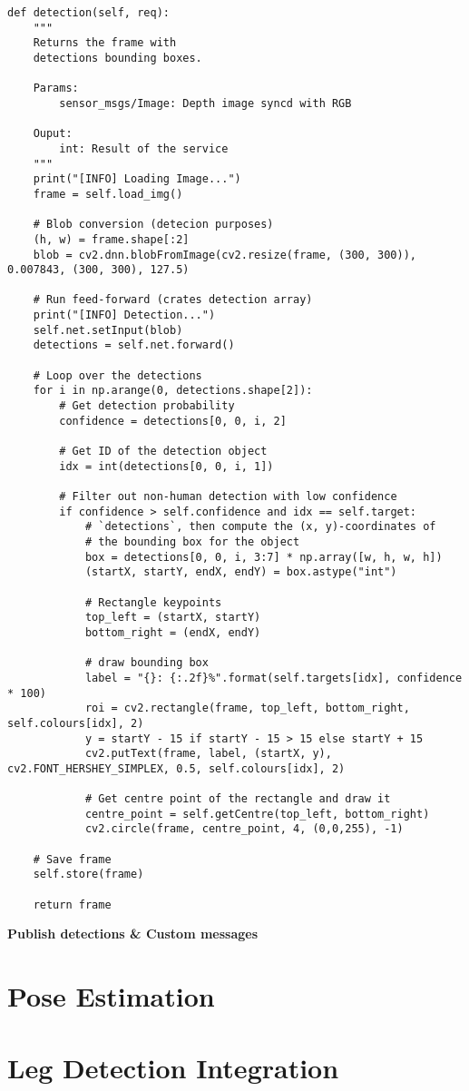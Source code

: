 \begin{lstlisting}
def detection(self, req):
	"""
    Returns the frame with
    detections bounding boxes.

    Params:
    	sensor_msgs/Image: Depth image syncd with RGB

    Ouput:
    	int: Result of the service
	"""
    print("[INFO] Loading Image...")
    frame = self.load_img()

    # Blob conversion (detecion purposes)
    (h, w) = frame.shape[:2]
    blob = cv2.dnn.blobFromImage(cv2.resize(frame, (300, 300)), 0.007843, (300, 300), 127.5)

    # Run feed-forward (crates detection array)
    print("[INFO] Detection...")
    self.net.setInput(blob)
    detections = self.net.forward()

    # Loop over the detections
    for i in np.arange(0, detections.shape[2]):
    	# Get detection probability
        confidence = detections[0, 0, i, 2]

        # Get ID of the detection object
        idx = int(detections[0, 0, i, 1])

        # Filter out non-human detection with low confidence
        if confidence > self.confidence and idx == self.target:
        	# `detections`, then compute the (x, y)-coordinates of
            # the bounding box for the object
            box = detections[0, 0, i, 3:7] * np.array([w, h, w, h])
            (startX, startY, endX, endY) = box.astype("int")

            # Rectangle keypoints
            top_left = (startX, startY)
            bottom_right = (endX, endY)

            # draw bounding box
            label = "{}: {:.2f}%".format(self.targets[idx], confidence * 100)
            roi = cv2.rectangle(frame, top_left, bottom_right, self.colours[idx], 2)
            y = startY - 15 if startY - 15 > 15 else startY + 15
            cv2.putText(frame, label, (startX, y), cv2.FONT_HERSHEY_SIMPLEX, 0.5, self.colours[idx], 2)

            # Get centre point of the rectangle and draw it
            centre_point = self.getCentre(top_left, bottom_right)
            cv2.circle(frame, centre_point, 4, (0,0,255), -1)

	# Save frame
    self.store(frame)

    return frame
\end{lstlisting}

\textbf{Publish detections \& Custom messages}



\section{Pose Estimation}
\section{Leg Detection Integration}